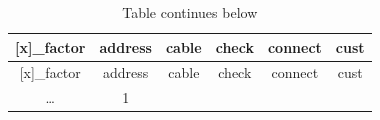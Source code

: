 \documentclass[]{article}
\begin{document}
\begin{longtable}[c]{@{}cccccc@{}}
\caption{Table continues below}\tabularnewline
\toprule
\begin{minipage}[b]{0.15\columnwidth}\centering\strut
{[}x{]}\_factor
\strut\end{minipage} &
\begin{minipage}[b]{0.12\columnwidth}\centering\strut
address
\strut\end{minipage} &
\begin{minipage}[b]{0.09\columnwidth}\centering\strut
cable
\strut\end{minipage} &
\begin{minipage}[b]{0.09\columnwidth}\centering\strut
check
\strut\end{minipage} &
\begin{minipage}[b]{0.12\columnwidth}\centering\strut
connect
\strut\end{minipage} &
\begin{minipage}[b]{0.07\columnwidth}\centering\strut
cust
\strut\end{minipage}\tabularnewline
\midrule
\endfirsthead
\toprule
\begin{minipage}[b]{0.15\columnwidth}\centering\strut
{[}x{]}\_factor
\strut\end{minipage} &
\begin{minipage}[b]{0.12\columnwidth}\centering\strut
address
\strut\end{minipage} &
\begin{minipage}[b]{0.09\columnwidth}\centering\strut
cable
\strut\end{minipage} &
\begin{minipage}[b]{0.09\columnwidth}\centering\strut
check
\strut\end{minipage} &
\begin{minipage}[b]{0.12\columnwidth}\centering\strut
connect
\strut\end{minipage} &
\begin{minipage}[b]{0.07\columnwidth}\centering\strut
cust
\strut\end{minipage}\tabularnewline
\midrule
\endhead
\begin{minipage}[t]{0.15\columnwidth}\centering\strut
\ldots{}
\strut\end{minipage} &
\begin{minipage}[t]{0.12\columnwidth}\centering\strut
1
\strut\end{minipage} &
\begin{minipage}[t]{0.09\columnwidth}\centering\strut

\end{minipage}
\end{longtable}
\end{document}
